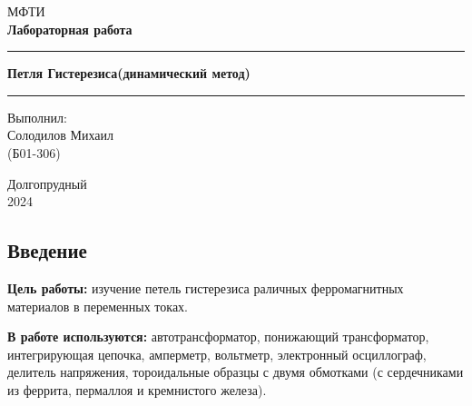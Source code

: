 \documentclass[a4paper, 12pt]{article}
\begin{document}

\begin{titlepage}
    \begin{center}
        \vspace*{5cm}
        \Huge МФТИ
        \vspace*{2cm}\\
        \LARGE \textbf{Лабораторная работа}
        \\\vspace*{0.25cm}

        \noindent\rule{\textwidth}{1pt}
        \vspace*{-0.25cm}

        \huge \textbf{Петля Гистерезиса(динамический метод)}
        \noindent\rule{\textwidth}{1pt}

        \vfill

        \begin{flushright}
            \begin{minipage}{.4\textwidth}
            \Large Выполнил: \\ Солодилов Михаил \\ (Б01-306)
            \end{minipage}
        \end{flushright}

        \vfill

        \normalsize Долгопрудный \\2024
    \end{center}
\end{titlepage}

\restoregeometry

\begin{center}
	\section*{Введение}
\end{center}

\begin{flushleft}
  \textbf{Цель работы:} изучение петель гистерезиса раличных ферромагнитных материалов в переменных токах.

\end{flushleft}

\begin{flushleft}
  \textbf{В работе используются:} автотрансформатор, понижающий трансформатор, интегрирующая цепочка, амперметр, вольтметр, электронный осциллограф, делитель напряжения, тороидальные образцы с двумя обмотками (с сердечниками из феррита, пермаллоя и кремнистого железа).

\end{flushleft}
\end{document}
